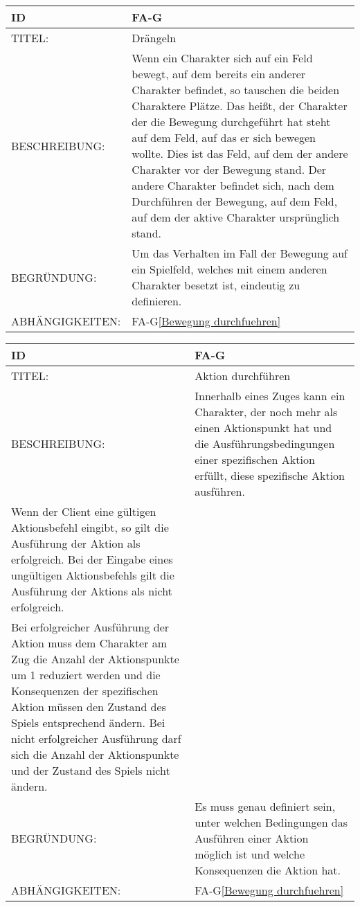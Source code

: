 \begin{tabularx}{16cm}{l|X}
	{table}\label{Draengeln}
	\textbf{ID} & \textbf{FA-G\arabic{table}} \\
	\hline
	TITEL: & Drängeln \\
	\hline
	BESCHREIBUNG: & Wenn ein Charakter sich auf ein Feld bewegt, auf dem bereits ein anderer Charakter 		befindet, so tauschen die beiden Charaktere Plätze. Das heißt, der Charakter der die Bewegung durchgeführt hat steht auf dem Feld, auf das er sich bewegen wollte. Dies ist das Feld, auf dem der andere Charakter vor der Bewegung stand. Der andere Charakter befindet sich, nach dem Durchführen der Bewegung, auf dem Feld, auf dem der aktive Charakter ursprünglich stand. \\
	\hline
	BEGRÜNDUNG: & Um das Verhalten im Fall der Bewegung auf ein Spielfeld, welches mit einem anderen 			Charakter besetzt ist, eindeutig zu definieren.\\
	\hline
	ABHÄNGIGKEITEN: & FA-G\ref{Bewegung durchfuehren} \todo[inline]{2.8.1 Wahlphase}\\
\end{tabularx}

\begin{tabularx}{16cm}{l|X}
	{table}\label{Aktion durchfuehren}
	\textbf{ID} & \textbf{FA-G\arabic{table}} \\
	\hline
	TITEL: & Aktion durchführen \\
	\hline
	BESCHREIBUNG: & Innerhalb eines Zuges kann ein Charakter, der noch mehr als einen Aktionspunkt hat und die Ausführungsbedingungen einer spezifischen Aktion erfüllt, diese spezifische Aktion ausführen. \\
	 Wenn der Client eine gültigen Aktionsbefehl eingibt, so gilt die Ausführung der Aktion als erfolgreich. Bei der Eingabe eines ungültigen Aktionsbefehls gilt die Ausführung der Aktions als nicht erfolgreich. \\
	 Bei erfolgreicher Ausführung der Aktion muss dem Charakter am Zug die Anzahl der Aktionspunkte um 1 reduziert werden und die Konsequenzen der spezifischen Aktion müssen den Zustand des Spiels entsprechend ändern. Bei nicht erfolgreicher Ausführung darf sich die Anzahl der Aktionspunkte und der Zustand des Spiels nicht ändern.  \\
	\hline
	BEGRÜNDUNG: & Es muss genau definiert sein, unter welchen Bedingungen das Ausführen einer Aktion möglich ist und welche Konsequenzen die Aktion hat.\\
	\hline
	ABHÄNGIGKEITEN: & FA-G\ref{Bewegung durchfuehren} \todo[inline]{2.8.1 Wahlphase}\\
\end{tabularx}


